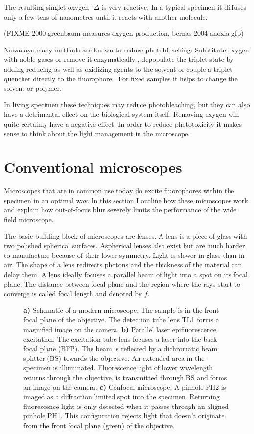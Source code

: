 The resulting singlet oxygen ${}^1\Delta$ is very reactive. In a
typical specimen it diffuses only a few tens of nanometres until it
reacts with another molecule.

(FIXME 2000 greenbaum measures oxygen production, bernas 2004 anoxia gfp)

Nowadays many methods are known to reduce photobleaching: Substitute
oxygen with noble gases or remove it enzymatically
\citep[p.~89]{Sauer2011}, depopulate the triplet state by adding
reducing as well as oxidizing agents to the solvent
\citep{Vogelsang2008} or couple a triplet quencher directly to the
fluorophore \citep[p.~19]{Sauer2011}. For fixed samples it helps to
change the solvent or polymer.
 
In living specimen these techniques may reduce photobleaching, but
they can also have a detrimental effect on the biological system
itself. Removing oxygen will quite certainly have a negative
effect. In order to reduce phototoxicity it makes sense to think about
the light management in the microscope.


\section{Conventional microscopes}
\begin{summary}
  Microscopes that are in common use today do excite fluorophores
  within the specimen in an optimal way. In this section I outline how
  these microscopes work and explain how out-of-focus blur severely
  limits the performance of the wide field microscope.
\end{summary}
The basic building block of microscopes are lenses. A lens is a piece
of glass with two polished spherical surfaces. Aspherical lenses also
exist but are much harder to manufacture because of their lower
symmetry. Light is slower in glass than in air. The shape of a lens
redirects photons and the thickness of the material can delay them. A
lens ideally focuses a parallel beam of light into a spot on its focal
plane. The distance between focal plane and the region where the rays
start to converge is called focal length and denoted by $f$.
\begin{figure}[!hbt]
  \centering
  \caption{{\bf a)} Schematic of a modern microscope. The sample is in
    the front focal plane of the objective. The detection tube lens
    TL1 forms a magnified image on the camera. {\bf b)} Parallel laser
    epifluorescence excitation. The excitation tube lens focuses a
    laser into the back focal plane (BFP). The beam is reflected by a
    dichromatic beam splitter (BS) towards the objective. An extended
    area in the specimen is illuminated. Fluorescence light of lower
    wavelength returns through the objective, is transmitted through
    BS and forms an image on the camera. {\bf c)} Confocal
    microscope. A pinhole PH2 is imaged as a diffraction limited spot
    into the specimen. Returning fluorescence light is only detected
    when it passes through an aligned pinhole PH1. This configuration
    rejects light that doesn't originate from the front focal plane
    (green) of the objective.}
  \label{fig:widefield-microscope}
\end{figure}

